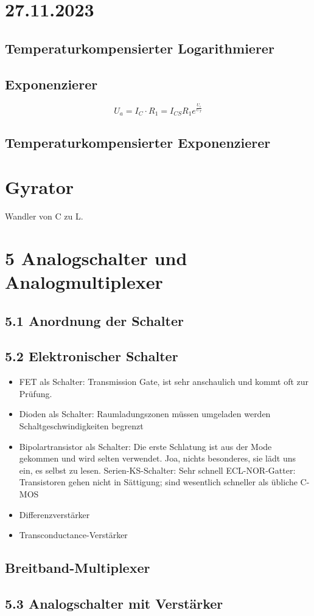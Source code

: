 \documentclass[a5paper]{article}
\begin{document}
\section*{27.11.2023}
\subsection*{Temperaturkompensierter Logarithmierer}

\subsection*{Exponenzierer}
\[ U_{a}=I_{C}\cdot R_{1}=I_{CS}R_{1}e^{\frac{U_{e}}{U_{T}}} \]
\subsection*{Temperaturkompensierter Exponenzierer}

\section*{Gyrator}
Wandler von C zu L.

\section*{5 Analogschalter und Analogmultiplexer}
\subsection*{5.1 Anordnung der Schalter}

\subsection*{5.2 Elektronischer Schalter}
\begin{itemize}
    
    \item FET als Schalter:
        Transmission Gate, ist sehr anschaulich und kommt oft zur Prüfung.
    \item Dioden als Schalter:
        Raumladungszonen müssen umgeladen werden \implies Schaltgeschwindigkeiten begrenzt
    \item Bipolartransistor als Schalter:
        Die erste Schlatung ist aus der Mode gekommen und wird selten verwendet.
        Joa, nichts besonderes, sie lädt uns ein, es selbst zu lesen.
        Serien-KS-Schalter: Sehr schnell
        ECL-NOR-Gatter: Transistoren gehen nicht in Sättigung; sind wesentlich schneller als übliche C-MOS
    \item Differenzverstärker
    \item Transconductance-Verstärker
\end{itemize}

\subsection*{Breitband-Multiplexer}

\subsection*{5.3 Analogschalter mit Verstärker}
\end{document}

